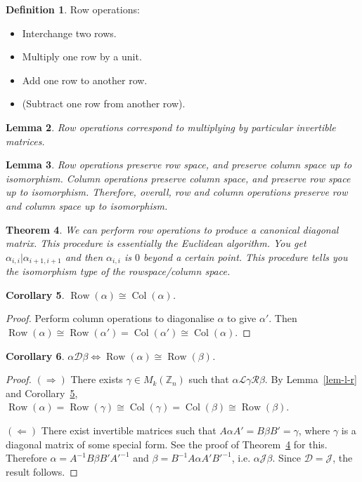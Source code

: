 \documentclass{article}
\renewcommand{\L}{\mathscr{L}}
\newcommand{\D}{\mathscr{D}}
\newcommand{\J}{\mathscr{J}}
\newcommand{\R}{\mathscr{R}}
\newcommand{\rowsp}{\operatorname{Row}}
\newcommand{\colsp}{\operatorname{Col}}
\newtheorem{thm}{Theorem}[section]
\newtheorem{lem}[thm]{Lemma}
\newtheorem{cor}[thm]{Corollary}
\theoremstyle{definition}
\newtheorem{defn}[thm]{Definition}
\begin{document}
\begin{defn}
  Row operations:
  \begin{itemize}
    \item
      Interchange two rows.
    \item
      Multiply one row by a unit.
    \item
      Add one row to another row.
    \item
      (Subtract one row from another row).
  \end{itemize}
\end{defn}

\begin{lem}
  Row operations correspond to multiplying by particular invertible matrices.
\end{lem}

\begin{lem}
  Row operations preserve row space, and preserve column space up to
  isomorphism.  Column operations preserve column space, and preserve row space
  up to isomorphism. Therefore, overall, row and column operations preserve row
  and column space up to isomorphism.
\end{lem}

\begin{thm}\label{thm-operations-diagonalise}
  We can perform row operations to produce a canonical diagonal matrix.  This
  procedure is essentially the Euclidean algorithm. You get $\alpha_{i, i} |
  \alpha_{i + 1, i + 1}$ and then $\alpha_{i, i}$ is $0$ beyond a certain point.
  This procedure tells you the isomorphism type of the rowspace/column space.
\end{thm}

\begin{cor}\label{cor-d}
  $\rowsp(\alpha) \cong \colsp(\alpha)$.
\end{cor}

\begin{proof}
  Perform column operations to diagonalise $\alpha$ to give $\alpha'$.  Then
  $\rowsp(\alpha) \cong \rowsp(\alpha') = \colsp(\alpha') \cong \colsp(\alpha)$.
\end{proof}

\begin{cor}
  $\alpha \D \beta \Leftrightarrow \rowsp(\alpha) \cong \rowsp(\beta)$.
\end{cor}

\begin{proof}
  $(\Rightarrow)$
  There exists $\gamma \in M_{k}(\mathbb{Z}_{n})$ such that $\alpha \L \gamma \R
  \beta$.
  By Lemma~\ref{lem-l-r} and Corollary~\ref{cor-d},
  $\rowsp(\alpha) = \rowsp(\gamma) \cong \colsp(\gamma) = \colsp(\beta) \cong
  \rowsp(\beta)$.

  $(\Leftarrow)$
  There exist invertible matrices such that $A \alpha A' = B \beta B' =
  \gamma$, where $\gamma$ is a diagonal matrix of some special form. See the
  proof of Theorem~\ref{thm-operations-diagonalise} for this. Therefore $\alpha
  = A^{-1}B \beta B'A'^{-1}$ and $\beta = B^{-1}A \alpha A'B'^{-1}$, i.e.
  $\alpha \J \beta$.  Since $\D = \J$, the result follows.
\end{proof}
\end{document}
